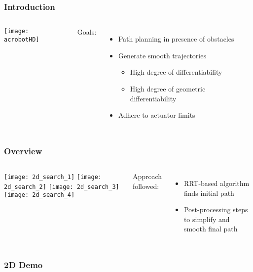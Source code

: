 \begin{frame}
	\frametitle{Introduction}

	\begin{columns}
			\begin{center}
				\texttt{[image: acrobotHD]}
			\end{center}


			Goals:

			\begin{itemize}

				\item
					Path planning in presence of obstacles

				\item
					Generate smooth trajectories

					\begin{itemize}
						\item High degree of differentiability
						\item High degree of geometric differentiability
					\end{itemize}

				\item
					Adhere to actuator limits

			\end{itemize}
	\end{columns}
\end{frame}

\begin{frame}
	\frametitle{Overview}

	\begin{columns}
		\column{0.75\textwidth}
			\begin{minipage}{\textwidth}
				\texttt{[image: 2d\_search\_1]}%
				\texttt{[image: 2d\_search\_2]}
				\texttt{[image: 2d\_search\_3]}%
				\texttt{[image: 2d\_search\_4]}
			\end{minipage}

		\column{0.25\textwidth}

			Approach followed:

			\begin{itemize}

				\item

					RRT-based algorithm finds initial path

				\item

					Post-processing steps to simplify and smooth final path

			\end{itemize}

	\end{columns}

\end{frame}

\begin{frame}
	\frametitle{2D Demo}

\end{frame}
